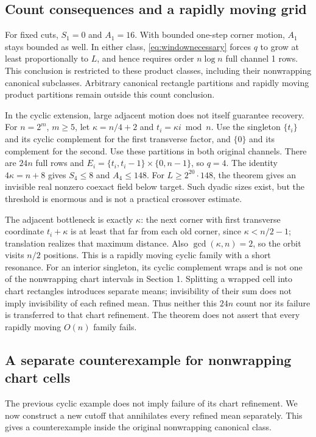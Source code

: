 \documentclass[11pt,a4paper]{article}
\begin{document}
\subsection{Count consequences and a rapidly moving grid}
For fixed cuts, $S_1=0$ and $A_1=16$. With bounded one-step corner
motion, $A_1$ stays bounded as well. In either class,
\eqref{eq:windownecessary} forces $q$ to grow at least proportionally to
$L$, and hence requires order $n\log n$ full channel 1 rows. This conclusion
is restricted to these product classes, including their nonwrapping
canonical subclasses. Arbitrary canonical rectangle partitions and
rapidly moving product partitions remain outside this count conclusion.

In the cyclic extension, large adjacent motion does not itself guarantee
recovery. For
$n=2^m$, $m\geq5$, let $\kappa=n/4+2$ and $t_i=\kappa i\bmod n$.
Use the singleton $\{t_i\}$ and its cyclic complement for the first
transverse factor, and $\{0\}$ and its complement for the second.
Use these partitions in both original channels. There are $24n$ full rows
and $E_i=\{t_i,t_i-1\}\times\{0,n-1\}$, so $q=4$.
The identity $4\kappa=n+8$ gives $S_4\leq8$ and $A_4\leq148$.
For $L\geq2^{20}\cdot148$, the theorem gives an invisible real nonzero
coexact field below target. Such dyadic sizes exist, but the threshold is
enormous and is not a practical crossover estimate.

The adjacent bottleneck is exactly $\kappa$: the next corner with first
transverse coordinate $t_i+\kappa$ is at least that far from each old
corner, since $\kappa<n/2-1$; translation realizes that maximum distance.
Also $\gcd(\kappa,n)=2$, so the orbit visits $n/2$ positions.
This is a rapidly moving cyclic family with a short resonance. For an
interior singleton, its cyclic complement wraps and is not one of the
nonwrapping chart intervals in Section 1. Splitting a wrapped cell into
chart rectangles introduces separate means; invisibility of their sum
does not imply invisibility of each refined mean. Thus neither this
$24n$ count nor its failure is transferred to that chart refinement.
The theorem does not assert that every rapidly moving $O(n)$ family fails.


\subsection{A separate counterexample for nonwrapping chart cells}
The previous cyclic example does not imply failure of its chart refinement.
We now construct a new cutoff that annihilates every refined mean separately.
This gives a counterexample inside the original nonwrapping canonical class.
\end{document}
